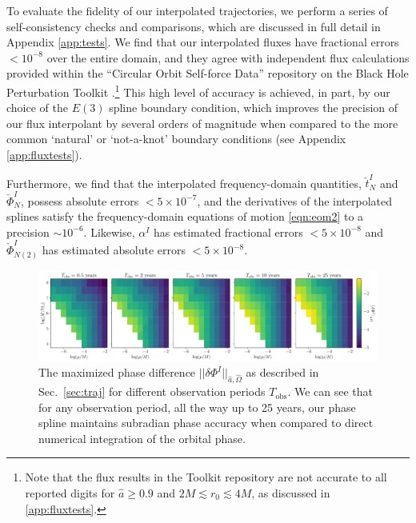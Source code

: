 \documentclass[%
 reprint,
 nofootinbib,
 amsmath,amssymb,
 aps,
 prd,
]{revtex4-2}
\begin{document}
To evaluate the fidelity of our interpolated trajectories, we perform a series of self-consistency checks and comparisons, which are discussed in full detail in Appendix \ref{app:tests}. We find that our interpolated fluxes have fractional errors $< 10^{-8}$ over the entire domain, and they agree with independent flux calculations \cite{TaraETC14, GralHughWarb16} provided within the ``Circular Orbit Self-force Data'' repository on the Black Hole Perturbation Toolkit \cite{BHPTK18}.\footnote{Note that the flux results in the Toolkit repository are not accurate to all reported digits for $\hat{a} \geq 0.9$ and $ 2M \lesssim r_0 \lesssim 4 M$, as discussed in \ref{app:fluxtests}.} This high level of accuracy is achieved, in part, by our choice of the $E(3)$ spline boundary condition, which improves the precision of our flux interpolant by several orders of magnitude when compared to the more common `natural' or `not-a-knot' boundary conditions (see Appendix \ref{app:fluxtests}). 

Furthermore, we find that the interpolated frequency-domain quantities, $\check{t}^I_N$ and $\check{\Phi}^I_N$, possess absolute errors $< 5\times 10^{-7}$, and the derivatives of the interpolated splines satisfy the frequency-domain equations of motion \eqref{eqn:eom2} to a precision $\sim 10^{-6}$. Likewise, $\alpha^I$ has estimated fractional errors $< 5\times 10^{-8}$ and $\check{\Phi}^I_{N(2)}$ has estimated absolute errors $< 5\times 10^{-8}$.

\begin{figure}[!htp]
    \centering
    \includegraphics[width=0.99\linewidth]{figures/deltaPhiTest.pdf}
    \caption{The maximized phase difference $||\delta \Phi^I||_{\hat{a}, \hat{\Omega}}$ as described in Sec.~\ref{sec:traj} for different observation periods $T_\mathrm{obs}$. We can see that for any observation period, all the way up to 25 years, our phase spline maintains subradian phase accuracy when compared to direct numerical integration of the orbital phase.}
    \label{fig:obsTime}
\end{figure}
\end{document}
